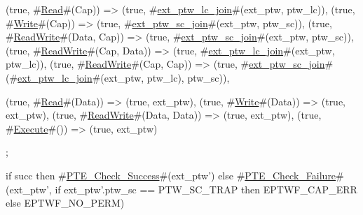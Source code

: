 {{    (true,  #\hyperref[sailRISCVzRead]{Read}#(Cap))             => (true, #\hyperref[sailRISCVzextzyptwzylczyjoin]{ext\_ptw\_lc\_join}#(ext_ptw, ptw_lc)),
    (true,  #\hyperref[sailRISCVzWrite]{Write}#(Cap))            => (true, #\hyperref[sailRISCVzextzyptwzysczyjoin]{ext\_ptw\_sc\_join}#(ext_ptw, ptw_sc)),
    (true,  #\hyperref[sailRISCVzReadWrite]{ReadWrite}#(Data, Cap))  => (true, #\hyperref[sailRISCVzextzyptwzysczyjoin]{ext\_ptw\_sc\_join}#(ext_ptw, ptw_sc)),
    (true,  #\hyperref[sailRISCVzReadWrite]{ReadWrite}#(Cap, Data))  => (true, #\hyperref[sailRISCVzextzyptwzylczyjoin]{ext\_ptw\_lc\_join}#(ext_ptw, ptw_lc)),
    (true,  #\hyperref[sailRISCVzReadWrite]{ReadWrite}#(Cap, Cap))   => (true, #\hyperref[sailRISCVzextzyptwzysczyjoin]{ext\_ptw\_sc\_join}#(#\hyperref[sailRISCVzextzyptwzylczyjoin]{ext\_ptw\_lc\_join}#(ext_ptw, ptw_lc), ptw_sc)),

    (true,  #\hyperref[sailRISCVzRead]{Read}#(Data))            => (true, ext_ptw),
    (true,  #\hyperref[sailRISCVzWrite]{Write}#(Data))           => (true, ext_ptw),
    (true,  #\hyperref[sailRISCVzReadWrite]{ReadWrite}#(Data, Data)) => (true, ext_ptw),
    (true,  #\hyperref[sailRISCVzExecute]{Execute}#())             => (true, ext_ptw)
  };

  if succ
  then #\hyperref[sailRISCVzPTEzyCheckzySuccess]{PTE\_Check\_Success}#(ext_ptw')
  else #\hyperref[sailRISCVzPTEzyCheckzyFailure]{PTE\_Check\_Failure}#(ext_ptw', if ext_ptw'.ptw_sc == PTW_SC_TRAP then EPTWF_CAP_ERR else EPTWF_NO_PERM)
}
